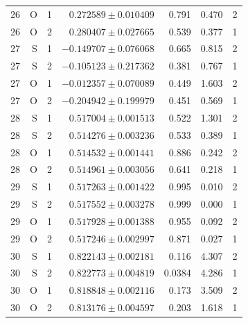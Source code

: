 {\begin{longtable}{lrrrrrr}
26 & O & 1 & $0.272589\pm0.010409$ & 0.791 & 0.470 & 2\\
26 & O & 2 & $0.280407\pm0.027665$ & 0.539 & 0.377 & 1\\
27 & S & 1 & $-0.149707\pm0.076068$ & 0.665 & 0.815 & 2\\
27 & S & 2 & $-0.105123\pm0.217362$ & 0.381 & 0.767 & 1\\
27 & O & 1 & $-0.012357\pm0.070089$ & 0.449 & 1.603 & 2\\
27 & O & 2 & $-0.204942\pm0.199979$ & 0.451 & 0.569 & 1\\
28 & S & 1 & $0.517004\pm0.001513$ & 0.522 & 1.301 & 2\\
28 & S & 2 & $0.514276\pm0.003236$ & 0.533 & 0.389 & 1\\
28 & O & 1 & $0.514532\pm0.001441$ & 0.886 & 0.242 & 2\\
28 & O & 2 & $0.514961\pm0.003056$ & 0.641 & 0.218 & 1\\
29 & S & 1 & $0.517263\pm0.001422$ & 0.995 & 0.010 & 2\\
29 & S & 2 & $0.517552\pm0.003278$ & 0.999 & 0.000 & 1\\
29 & O & 1 & $0.517928\pm0.001388$ & 0.955 & 0.092 & 2\\
29 & O & 2 & $0.517246\pm0.002997$ & 0.871 & 0.027 & 1\\
30 & S & 1 & $0.822143\pm0.002181$ & 0.116 & 4.307 & 2\\
30 & S & 2 & $0.822773\pm0.004819$ & 0.0384 & 4.286 & 1\\
30 & O & 1 & $0.818848\pm0.002116$ & 0.173 & 3.509 & 2\\
30 & O & 2 & $0.813176\pm0.004597$ & 0.203 & 1.618 & 1\\
\end{longtable}}

